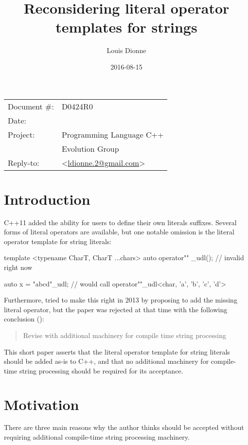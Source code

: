 \documentclass[11pt]{article}
\date{}
\title{Reconsidering literal operator templates for strings}
\author{}
\begin{document}
\maketitle\vspace{-2cm}

\begin{flushright}
  \begin{tabular}{ll}
  Document \#:&D0424R0\\
  Date:       &\date{2016-08-15}\\
  Project:    &Programming Language C++\\
              &Evolution Group\\
  Reply-to:   &\author{Louis Dionne} \textless\href{mailto:ldionne.2@gmail.com}{ldionne.2@gmail.com}\textgreater
  \end{tabular}
\end{flushright}


\section{Introduction}
C++11 added the ability for users to define their own literals suffixes.
Several forms of literal operators are available, but one notable omission
is the literal operator template for string literals:

\begin{cpp}
template <typename CharT, CharT ...chars>
auto operator"" _udl(); // invalid right now

auto x = "abcd"_udl; // would call operator""_udl<char, 'a', 'b', 'c', 'd'>
\end{cpp}

Furthermore, \cite{N3599} tried to make this right in 2013 by proposing to add
the missing literal operator, but the paper was rejected at that time with
the following conclusion (\cite{CWG66}):

\begin{quote}
  Revise with additional machinery for compile time string processing
\end{quote}

This short paper asserts that the literal operator template for string
literals should be added as-is to C++, and that no additional machinery
for compile-time string processing should be required for its acceptance.


\section{Motivation}
There are three main reasons why the author thinks \cite{N3599} should be
accepted without requiring additional compile-time string processing machinery.
\end{document}
